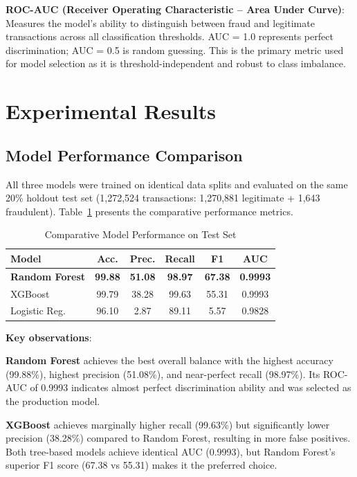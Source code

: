 \documentclass[conference]{IEEEtran}
\begin{document}
\textbf{ROC-AUC (Receiver Operating Characteristic -- Area Under Curve)}: Measures the model's ability to distinguish between fraud and legitimate transactions across all classification thresholds. AUC = 1.0 represents perfect discrimination; AUC = 0.5 is random guessing. This is the primary metric used for model selection as it is threshold-independent and robust to class imbalance.

\section{Experimental Results}

\subsection{Model Performance Comparison}
All three models were trained on identical data splits and evaluated on the same 20\% holdout test set (1,272,524 transactions: 1,270,881 legitimate + 1,643 fraudulent). Table~\ref{tab:model_perf} presents the comparative performance metrics.

\begin{table}[t]
\caption{Comparative Model Performance on Test Set}
\label{tab:model_perf}
\centering
\small
\begin{tabular}{|l|c|c|c|c|c|}
\hline
\textbf{Model} & \textbf{Acc.} & \textbf{Prec.} & \textbf{Recall} & \textbf{F1} & \textbf{AUC} \\
\hline
\rowcolor{green!10}
\textbf{Random Forest} & \textbf{99.88} & \textbf{51.08} & \textbf{98.97} & \textbf{67.38} & \textbf{0.9993} \\
\hline
XGBoost & 99.79 & 38.28 & 99.63 & 55.31 & 0.9993 \\
\hline
Logistic Reg. & 96.10 & 2.87 & 89.11 & 5.57 & 0.9828 \\
\hline
\end{tabular}
\end{table}

\textbf{Key observations}:

\textbf{Random Forest} achieves the best overall balance with the highest accuracy (99.88\%), highest precision (51.08\%), and near-perfect recall (98.97\%). Its ROC-AUC of 0.9993 indicates almost perfect discrimination ability and was selected as the production model.

\textbf{XGBoost} achieves marginally higher recall (99.63\%) but significantly lower precision (38.28\%) compared to Random Forest, resulting in more false positives. Both tree-based models achieve identical AUC (0.9993), but Random Forest's superior F1 score (67.38 vs 55.31) makes it the preferred choice.
\end{document}
